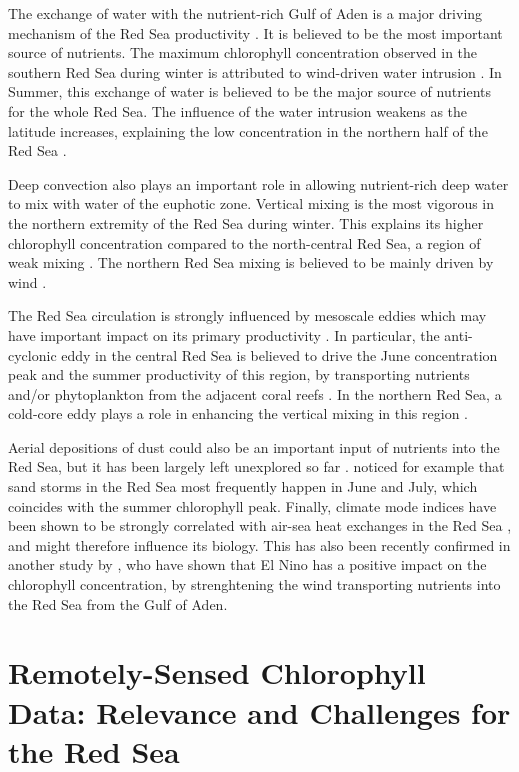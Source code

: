The exchange of water with the nutrient-rich Gulf of Aden is a major driving
mechanism of the Red Sea productivity \citep{Triantafyllou2014}. It is believed
to be the most important source of nutrients. The maximum chlorophyll
concentration observed in the southern Red Sea during winter is attributed to
wind-driven water intrusion \citep{Raitsos2013, Yao2014}. In Summer, this
exchange of water is believed to be the major source of nutrients for the whole
Red Sea. The influence of the water intrusion weakens as the latitude
increases, explaining the low concentration in the northern half of the Red Sea
\citep{Raitsos2013}.

Deep convection also plays an important role in allowing nutrient-rich deep
water to mix with water of the euphotic zone. Vertical mixing is the most
vigorous in the northern extremity of the Red Sea during winter. This
explains its higher chlorophyll concentration compared to the north-central Red
Sea, a region of weak mixing \citep{Raitsos2013}. The northern Red Sea mixing
is believed to be mainly driven by wind \citep{Raitsos2013}.

The Red Sea circulation is strongly influenced by mesoscale eddies
\citep{Yao2014, Yao2014b, Zhan2014} which may have important impact on its
primary productivity \citep{Zhai2013}. In particular, the anti-cyclonic eddy in
the central Red Sea is believed to drive the June concentration peak and the
summer productivity of this region, by transporting nutrients and/or
phytoplankton from the adjacent coral reefs \citep{Raitsos2013}. In the
northern Red Sea, a cold-core eddy plays a role in enhancing the vertical
mixing in this region \citep{Raitsos2013}.

Aerial depositions of dust could also be an important input of nutrients into
the Red Sea, but it has been largely left unexplored so far
\citep{Triantafyllou2014}.
\citet{Raitsos2013} noticed for example that sand storms in the Red Sea most
frequently happen in June and July, which coincides with the summer chlorophyll
peak. Finally, climate mode indices have been shown to be strongly correlated
with air-sea heat exchanges in the Red Sea \citep{Abualnaja2015}, and might
therefore influence its biology. This has also been recently confirmed in
another study by \citet{Raitsos2015}, who have shown that El Nino has a
positive impact on the chlorophyll concentration, by strenghtening the wind
transporting nutrients into the Red Sea from the Gulf of Aden.

\section{Remotely-Sensed Chlorophyll Data: Relevance and Challenges for the Red
Sea}

